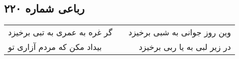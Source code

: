 \begin{center}
\section*{رباعی شماره ۲۲۰}
\label{sec:sh220}
\begin{longtable}{l p{0.5cm} r}
گر غره به عمری به تبی برخیزد
&&
وین روز جوانی به شبی برخیزد
\\
بیداد مکن که مردم آزاری تو
&&
در زیر لبی به یا ربی برخیزد
\\
\end{longtable}
\end{center}
